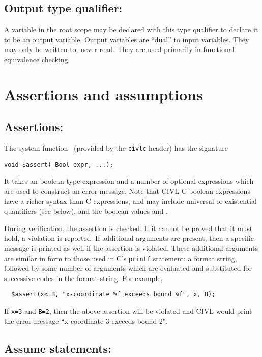 \subsection{Output type qualifier: \coutput}

A variable in the root scope may be declared with this type qualifier
to declare it to be an output variable.  Output variables are ``dual''
to input variables.  They may only be written to, never read.  They
are used primarily in functional equivalence checking.

\section{Assertions and assumptions}
\label{sec:assertionAndAssumption}
\subsection{Assertions: \cassert}

The system function \cassert\ (provided by the \texttt{civlc} header) has the signature
\begin{verbatim}
void $assert(_Bool expr, ...);
\end{verbatim}

It takes an boolean type expression and a number of optional expressions which are used to construct an error message.
Note that CIVL-C boolean expressions have a richer syntax than C
expressions, and may include universal or existential quantifiers
(see below), and the boolean values  \ctrue{} and \cfalse{}.

During verification, the assertion is checked.  If it cannot be proved
that it must hold, a violation is reported. If additional arguments are present, then a specific message is printed as well if the assertion is violated.  These
additional arguments are similar in form to those used in C's
\texttt{printf} statement: a format string, followed by some number of
arguments which are evaluated and substituted for successive codes in
the format string.  For example,
\begin{verbatim}
  $assert(x<=B, "x-coordinate %f exceeds bound %f", x, B); 
\end{verbatim}

If \texttt{x=3} and \texttt{B=2}, then the above assertion will be violated and CIVL would print the error message ``x-coordinate 3 exceeds bound 2".

\subsection{Assume statements: \cassume}


